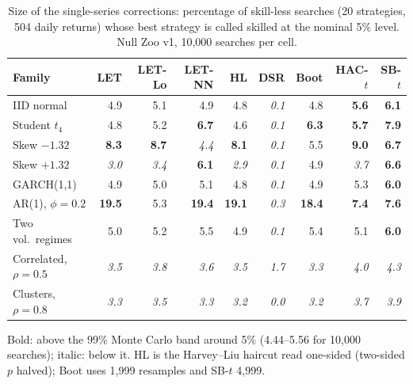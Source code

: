 \begin{table}[t]
\centering
\small
\caption{Size of the single-series corrections: percentage of skill-less searches (20 strategies, 504 daily returns) whose best strategy is called skilled at the nominal 5\% level. Null Zoo v1, 10{,}000 searches per cell.}
\label{tab:size-single}
\begin{tabular}{lrrrrrrrr}
\toprule
Family & LET & LET-Lo & LET-NN & HL & DSR & Boot & HAC-$t$ & SB-$t$ \\
\midrule
IID normal & 4.9 & 5.1 & 4.9 & 4.8 & \textit{0.1} & 4.8 & \textbf{5.6} & \textbf{6.1} \\
Student $t_4$ & 4.8 & 5.2 & \textbf{6.7} & 4.6 & \textit{0.1} & \textbf{6.3} & \textbf{5.7} & \textbf{7.9} \\
Skew $-1.32$ & \textbf{8.3} & \textbf{8.7} & \textit{4.4} & \textbf{8.1} & \textit{0.1} & 5.5 & \textbf{9.0} & \textbf{6.7} \\
Skew $+1.32$ & \textit{3.0} & \textit{3.4} & \textbf{6.1} & \textit{2.9} & \textit{0.1} & 4.9 & \textit{3.7} & \textbf{6.6} \\
GARCH(1,1) & 4.9 & 5.0 & 5.1 & 4.8 & \textit{0.1} & 4.9 & 5.3 & \textbf{6.0} \\
AR(1), $\phi=0.2$ & \textbf{19.5} & 5.3 & \textbf{19.4} & \textbf{19.1} & \textit{0.3} & \textbf{18.4} & \textbf{7.4} & \textbf{7.6} \\
Two vol.\ regimes & 5.0 & 5.2 & 5.5 & 4.9 & \textit{0.1} & 5.4 & 5.1 & \textbf{6.0} \\
Correlated, $\rho=0.5$ & \textit{3.5} & \textit{3.8} & \textit{3.6} & \textit{3.5} & \textit{1.7} & \textit{3.3} & \textit{4.0} & \textit{4.3} \\
Clusters, $\rho=0.8$ & \textit{3.3} & \textit{3.5} & \textit{3.3} & \textit{3.2} & \textit{0.0} & \textit{3.2} & \textit{3.7} & \textit{3.9} \\
\bottomrule
\end{tabular}
\par\smallskip\begin{minipage}{0.97\linewidth}\footnotesize Bold: above the 99\% Monte Carlo band around 5\% (4.44--5.56 for 10{,}000 searches); italic: below it. HL is the Harvey--Liu haircut read one-sided (two-sided $p$ halved); Boot uses 1{,}999 resamples and SB-$t$ 4{,}999.\end{minipage}
\end{table}

